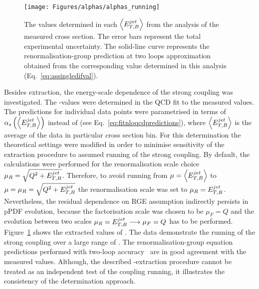 \begin{figure}[t!]
 \centering
 \texttt{[image: Figures/alphas/alphas\_running]}
 \caption{The \as values determined in each $\left<\mbox{$E_{T,B}^{jet}$}\right>$ from the analysis of the measured \dsdetjetb cross section. The error bars represent the total experimental uncertainty. The solid-line curve represents the renormalisation-group prediction at two loops approximation obtained from the corresponding \asz value determined in this analysis (Eq.~\eqref{eq:assingledifval}).}
 \label{fig:asrunning}
\end{figure}
Besides \asz extraction, the energy-scale dependence of the strong coupling was investigated. The \as-values were determined in the QCD fit to the measured \dsdetjetb values. The predictions for individual \dsdetjetb data points were parametrised in terms of $\mbox{$\alpha_{s}$}\left(\left<\mbox{$E_{T,B}^{jet}$}\right>\right)$ instead of \asz (see Eq.~\eqref{eq:fitnloqcdpredictions}), where $\left<\mbox{$E_{T,B}^{jet}$}\right>$ is the average \etjetb of the data in particular cross section bin. For this determination the theoretical settings were modified in order to minimise sensitivity of the extraction procedure to assumed running of the strong coupling. By default, the calculations were performed for the renormalisation scale choice $\mu_R=\sqrt{\mbox{${Q^2}$}+\mbox{$E_{T,B}^{jet}$}}$. Therefore, to avoid running from $\mu=\left<\mbox{$E_{T,B}^{jet}$}\right>$ to $\mu=\mu_R=\sqrt{\mbox{${Q^2}$}+\mbox{$E_{T,B}^{jet}$}}$ the renormalisation scale was set to $\mu_R=\mbox{$E_{T,B}^{jet}$}$. Nevertheless, the residual dependence on RGE assumption indirectly persists in pPDF evolution, because the factorisation scale was chosen to be $\mu_F=Q$ and the evolution between two scales $\mu_R = \mbox{$E_{T,B}^{jet}$} \longrightarrow \mu_F = Q$ has to be performed. Figure~\ref{fig:asrunning} shows the extracted values of \as. The data demonstrate the running of the strong coupling over a large range of \etjetb. The renormalisation-group equation predictions performed with two-loop accuracy~\cite{Gross:1973id, Politzer:1973fx, Gross:1973ju, Politzer:1974fr} are in good agreement with the measured values. Although, the described \as-extraction procedure cannot be treated as an independent test of the coupling running, it illustrates the consistency of the \as determination approach.


